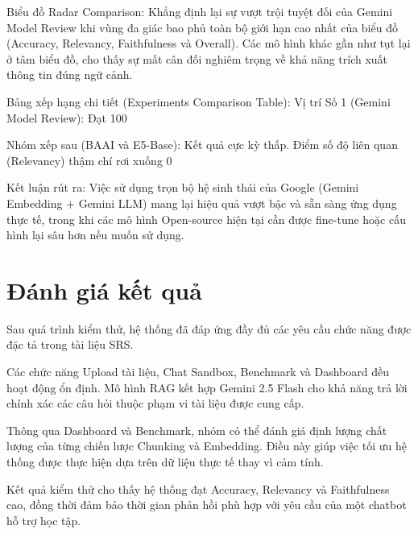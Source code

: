Biểu đồ Radar Comparison: Khẳng định lại sự vượt trội tuyệt đối của Gemini Model Review khi vùng đa giác bao phủ toàn bộ giới hạn cao nhất của biểu đồ (Accuracy, Relevancy, Faithfulness và Overall). Các mô hình khác gần như tụt lại ở tâm biểu đồ, cho thấy sự mất cân đối nghiêm trọng về khả năng trích xuất thông tin đúng ngữ cảnh.

Bảng xếp hạng chi tiết (Experiments Comparison Table):
Vị trí Số 1 (Gemini Model Review): Đạt 100%

Nhóm xếp sau (BAAI và E5-Base): Kết quả cực kỳ thấp. Điểm số độ liên quan (Relevancy) thậm chí rơi xuống 0%

Kết luận rút ra: Việc sử dụng trọn bộ hệ sinh thái của Google (Gemini Embedding + Gemini LLM) mang lại hiệu quả vượt bậc và sẵn sàng ứng dụng thực tế, trong khi các mô hình Open-source hiện tại cần được fine-tune hoặc cấu hình lại sâu hơn nếu muốn sử dụng.

\section{Đánh giá kết quả}

Sau quá trình kiểm thử, hệ thống đã đáp ứng đầy đủ các yêu cầu chức năng được đặc tả trong tài liệu SRS.

Các chức năng Upload tài liệu, Chat Sandbox, Benchmark và Dashboard đều hoạt động ổn định. Mô hình RAG kết hợp Gemini 2.5 Flash cho khả năng trả lời chính xác các câu hỏi thuộc phạm vi tài liệu được cung cấp.

Thông qua Dashboard và Benchmark, nhóm có thể đánh giá định lượng chất lượng của từng chiến lược Chunking và Embedding. Điều này giúp việc tối ưu hệ thống được thực hiện dựa trên dữ liệu thực tế thay vì cảm tính.

Kết quả kiểm thử cho thấy hệ thống đạt Accuracy, Relevancy và Faithfulness cao, đồng thời đảm bảo thời gian phản hồi phù hợp với yêu cầu của một chatbot hỗ trợ học tập.